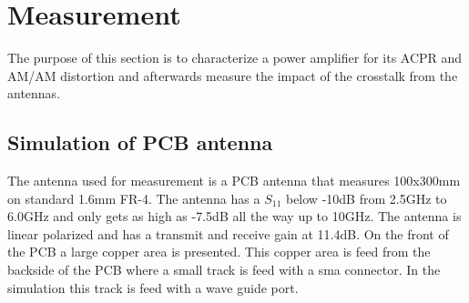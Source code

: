 \chapter{Measurement}\label{ch:measurement}
The purpose of this section is to characterize a power amplifier for its ACPR and AM/AM distortion and afterwards measure the impact of the crosstalk from the antennas. 

\section{Simulation of PCB antenna}
The antenna used for measurement is a PCB antenna that measures 100x300mm on standard 1.6mm FR-4. The antenna has a $S_{11}$ below -10dB from 2.5GHz to 6.0GHz and only gets as high as -7.5dB all the way up to 10GHz. The antenna is linear polarized and has a transmit and receive gain at 11.4dB. On the front of the PCB a large copper area is presented. This copper area is feed from the backside of the PCB where a small track is feed with a sma connector. In the simulation this track is feed with a wave guide port.  
   
